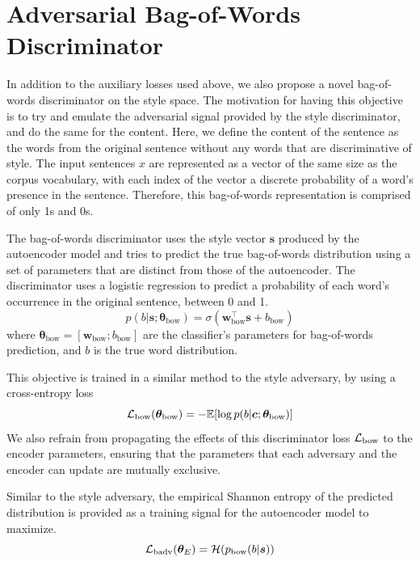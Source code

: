 \section{Adversarial Bag-of-Words Discriminator} \label{sec:adversarial-bow-objective}

In addition to the auxiliary losses used above, we also propose a novel bag-of-words discriminator on the style space. The motivation for having this objective is to try and emulate the adversarial signal provided by the style discriminator, and do the same for the content. Here, we define the content of the sentence as the words from the original sentence without any words that are discriminative of style. The input sentences $x$ are represented as a vector of the same size as the corpus vocabulary, with each index of the vector a discrete probability of a word's presence in the sentence. Therefore, this bag-of-words representation is comprised of only 1s and 0s.

The bag-of-words discriminator uses the style vector $\bm s$ produced by the autoencoder model and tries to predict the true bag-of-words distribution using a set of parameters that are distinct from those of the autoencoder. The discriminator uses a logistic regression to predict a probability of each word's occurrence in the original sentence, between 0 and 1.
\begin{equation}
	p(b | \bm s; \bm\theta_\text{bow}) = \sigma(\bm w_\text{bow}^\top \bm s + b_\text{bow})
\end{equation}
where $\bm\theta_\text{bow}=[\bm w_\text{bow}; b_\text{bow}]$ are the classifier's parameters for bag-of-words prediction, and $b$ is the true word distribution.

This objective is trained in a similar method to the style adversary, by using a cross-entropy loss
\begin{equation} \label{eqn:adv-bow-disc-loss}
	\mathcal{L}_\text{bow}(\bm\theta_\text{bow}) =
	- \mathbb{E} [\log p(b | \bm c; \bm\theta_\text{bow})]
\end{equation}
We also refrain from propagating the effects of this discriminator loss $\mathcal{L}_\text{bow}$ to the encoder parameters, ensuring that the parameters that each adversary and the encoder can update are mutually exclusive.

Similar to the style adversary, the empirical Shannon entropy of the predicted distribution is provided as a training signal for the autoencoder model to maximize.
\begin{equation}
	\mathcal{L}_\text{badv}(\bm\theta_E) = \mathcal{H}(p_\text{bow}(b | \bm s))
\end{equation}

